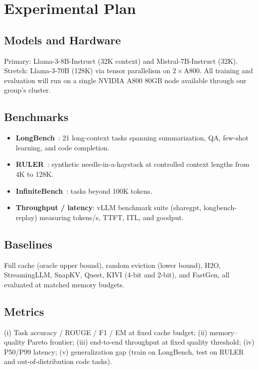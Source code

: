 \documentclass[journal]{IEEEtran}
\begin{document}
\section{Experimental Plan}
\label{sec:exp}

\subsection{Models and Hardware}
Primary: Llama-3-8B-Instruct (32K context) and Mistral-7B-Instruct (32K). Stretch: Llama-3-70B (128K) via tensor parallelism on $2\times$A800. All training and evaluation will run on a single NVIDIA A800 80GB node available through our group's cluster.

\subsection{Benchmarks}
\begin{itemize}
    \item \textbf{LongBench}~\cite{bai2024longbench}: 21 long-context tasks spanning summarization, QA, few-shot learning, and code completion.
    \item \textbf{RULER}~\cite{hsieh2024ruler}: synthetic needle-in-a-haystack at controlled context lengths from 4K to 128K.
    \item \textbf{InfiniteBench}~\cite{zhang2024infinitebench}: tasks beyond 100K tokens.
    \item \textbf{Throughput / latency}: vLLM benchmark suite (sharegpt, longbench-replay) measuring tokens/s, TTFT, ITL, and goodput.
\end{itemize}

\subsection{Baselines}
Full cache (oracle upper bound), random eviction (lower bound), H2O, StreamingLLM, SnapKV, Quest, KIVI (4-bit and 2-bit), and FastGen, all evaluated at matched memory budgets.

\subsection{Metrics}
(i) Task accuracy / ROUGE / F1 / EM at fixed cache budget; (ii) memory--quality Pareto frontier; (iii) end-to-end throughput at fixed quality threshold; (iv) P50/P99 latency; (v) generalization gap (train on LongBench, test on RULER and out-of-distribution code tasks).
\end{document}
